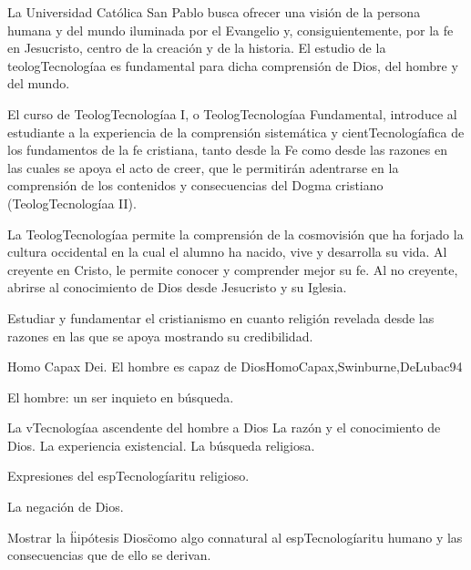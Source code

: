 \begin{syllabus}


\begin{justification}
La Universidad Católica San Pablo busca ofrecer una visión de la persona humana y del mundo iluminada por el Evangelio y, consiguientemente, por la fe en Jesucristo, centro de la creación y de la historia. El estudio de la teologTecnologíaa es fundamental para dicha comprensión de Dios, del hombre y del mundo.

El curso de TeologTecnologíaa I, o TeologTecnologíaa Fundamental, introduce al estudiante a la experiencia de la comprensión sistemática y cientTecnologíafica de los fundamentos de la fe cristiana, tanto desde la Fe como desde las razones en las cuales se apoya el acto de creer, que le permitirán adentrarse en la comprensión de los contenidos y consecuencias del Dogma cristiano (TeologTecnologíaa II).

La TeologTecnologíaa permite la comprensión de la cosmovisión que ha forjado la cultura occidental en la cual el alumno ha nacido, vive y desarrolla su vida. Al creyente en Cristo, le permite conocer y comprender mejor su fe. Al no creyente, abrirse al conocimiento de Dios desde Jesucristo y su Iglesia.
\end{justification}

\begin{goals}
\item Estudiar y fundamentar el cristianismo en cuanto religión revelada desde las razones en las que se apoya mostrando su credibilidad. 
\end{goals}

\begin{outcomes}
\end{outcomes}

\begin{unit}{Homo Capax Dei. El hombre es capaz de Dios}{HomoCapax,Swinburne,DeLubac}{9}{4}
\begin{topics}
	\item El hombre: un ser inquieto en búsqueda.
	\item	La vTecnologíaa ascendente del hombre a Dios
		\subitem	La razón y el conocimiento de Dios.
		\subitem	La experiencia existencial.
		\subitem	La búsqueda religiosa.
	\item	Expresiones del espTecnologíaritu religioso.
	\item	La negación de Dios.
\end{topics}
\begin{learningoutcomes}
	\item Mostrar la \"hipótesis Dios\" como algo connatural al espTecnologíaritu humano y las consecuencias que de ello se derivan.
\end{learningoutcomes}
\end{unit}


\end{syllabus}
